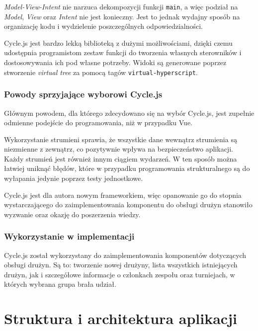 \documentclass[shortabstract]{iithesis}
\theoremstyle{definition} \newtheorem{definition}{Definicja}[]
\theoremstyle{remark} \newtheorem{remark}[definition]{Observation}
\theoremstyle{plain} \newtheorem{theorem}[definition]{Theorem}
\theoremstyle{plain} \newtheorem{lemma}[definition]{Lemma}
\begin{document}
\textit{Model-View-Intent} nie narzuca dekompozycji funkcji \texttt{main}, a więc podział na \textit{Model}, \textit{View} oraz \textit{Intent} nie jest konieczny. Jest to jednak wydajny sposób na organizację kodu i wydzielenie poszczególnych odpowiedzialności.

Cycle.js jest bardzo lekką biblioteką z dużymi możliwościami, dzięki czemu udostępnia programistom zestaw funkcji do tworzenia własnych sterowników i dostosowywania ich pod własne potrzeby. Widoki są generowane poprzez stworzenie \textit{virtual tree} za pomocą tagów \texttt{virtual-hyperscript}.

\subsection{Powody sprzyjające wyborowi Cycle.js}
Głównym powodem, dla którego zdecydowano się na wybór Cycle.js, jest zupełnie odmienne podejście do programowania, niż w przypadku Vue.

Wykorzystanie strumieni sprawia, że wszystkie dane wewnątrz strumienia są niezmienne z zewnątrz, co pozytywnie wpływa na bezpieczeństwo aplikacji. Każdy strumień jest również innym ciągiem wydarzeń. W ten sposób można łatwiej uniknąć błędów, które w przypadku programowania strukturalnego są do wyłapania jedynie poprzez testy jednostkowe.

Cycle.js jest dla autora nowym frameworkiem, więc opanowanie go do stopnia wystarczającego do zaimplementowania komponentu do obsługi drużyn stanowiło wyzwanie oraz okazję do poszerzenia wiedzy.

\subsection{Wykorzystanie w implementacji}
Cycle.js został wykorzystany do zaimplementowania komponentów dotyczących obsługi drużyn. Są to: tworzenie nowej drużyny, lista wszystkich istniejących drużyn, jak i szczegółowe informacje o członkach zespołu oraz turniejach, w których wybrana grupa brała udział.


\chapter{Struktura i architektura aplikacji}
\end{document}
